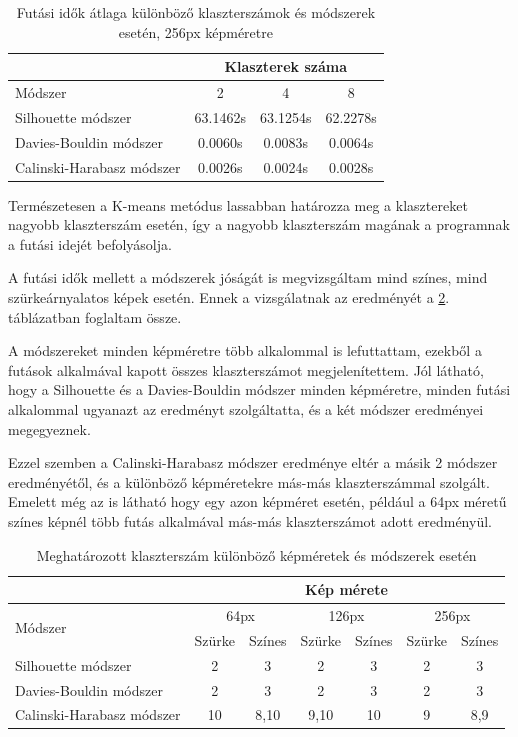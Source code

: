\begin{table}[h]
\centering
\caption{Futási idők átlaga különböző klaszterszámok és módszerek esetén, 256px képméretre}
\label{tab:cluster_runtimes}
\medskip
\begin{tabular}{|l|c|c|c|}
\cline{2-4}
 \multicolumn{1}{c|}{} & \multicolumn{3}{c|}{Klaszterek száma} \\
 \hline
 Módszer & 2 & 4 & 8 \\
\hline
Silhouette módszer & 63.1462s & 63.1254s & 62.2278s \\
Davies-Bouldin módszer & 0.0060s & 0.0083s & 0.0064s \\
Calinski-Harabasz módszer & 0.0026s & 0.0024s & 0.0028s \\
\hline
\end{tabular}
\end{table}

Természetesen a K-means metódus lassabban határozza meg a klasztereket nagyobb klaszterszám esetén, így a nagyobb klaszterszám magának a programnak a futási idejét befolyásolja.

A futási idők mellett a módszerek jóságát is megvizsgáltam mind színes, mind szürkeárnyalatos képek esetén. Ennek a vizsgálatnak az eredményét a \ref{tab:cluster_result}. táblázatban foglaltam össze.

A módszereket minden képméretre több alkalommal is lefuttattam, ezekből a futások alkalmával kapott összes klaszterszámot megjelenítettem. Jól látható, hogy a Silhouette és a Davies-Bouldin módszer minden képméretre, minden futási alkalommal ugyanazt az eredményt szolgáltatta, és a két módszer eredményei megegyeznek.

Ezzel szemben a Calinski-Harabasz módszer eredménye eltér a másik 2 módszer eredményétől, és a különböző képméretekre más-más klaszterszámmal szolgált. Emelett még az is látható hogy egy azon képméret esetén, például a 64px méretű színes képnél több futás alkalmával más-más klaszterszámot adott eredményül.

\begin{table}[h]
\centering
\caption{Meghatározott klaszterszám különböző képméretek és módszerek esetén}
\label{tab:cluster_result}
\medskip
\begin{tabular}{|l|c|c|c|c|c|c|}
\cline{2-7}
 \multicolumn{1}{c|}{} & \multicolumn{6}{c|}{Kép mérete} \\
 \hline
 \multirow{2}{*}{Módszer} & \multicolumn{2}{c|}{64px} & \multicolumn{2}{c|}{126px} & \multicolumn{2}{c|}{256px} \\
 \cline{2-7}
 & Szürke & Színes & Szürke & Színes & Szürke & Színes  \\
\hline
Silhouette módszer & 2 & 3 & 2 & 3 & 2 & 3 \\
Davies-Bouldin módszer & 2 & 3 & 2 & 3 & 2 & 3 \\
Calinski-Harabasz módszer & 10 & 8,10 & 9,10 & 10 & 9 & 8,9 \\
\hline
\end{tabular}
\end{table}

